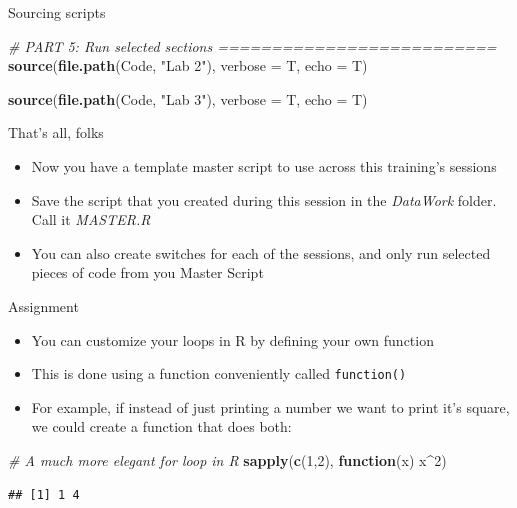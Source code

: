 \documentclass[ignorenonframetext,]{beamer}
\newenvironment{Shaded}{\begin{snugshade}}{\end{snugshade}}
\newcommand{\KeywordTok}[1]{\textcolor[rgb]{0.13,0.29,0.53}{\textbf{#1}}}
\newcommand{\DataTypeTok}[1]{\textcolor[rgb]{0.13,0.29,0.53}{#1}}
\newcommand{\DecValTok}[1]{\textcolor[rgb]{0.00,0.00,0.81}{#1}}
\newcommand{\StringTok}[1]{\textcolor[rgb]{0.31,0.60,0.02}{#1}}
\newcommand{\CommentTok}[1]{\textcolor[rgb]{0.56,0.35,0.01}{\textit{#1}}}
\newcommand{\ControlFlowTok}[1]{\textcolor[rgb]{0.13,0.29,0.53}{\textbf{#1}}}
\newcommand{\OperatorTok}[1]{\textcolor[rgb]{0.81,0.36,0.00}{\textbf{#1}}}
\newcommand{\NormalTok}[1]{#1}
\providecommand{\tightlist}{%
  \setlength{\itemsep}{0pt}\setlength{\parskip}{0pt}}
\begin{document}
\begin{frame}[fragile]{Sourcing scripts}

\begin{Shaded}
\begin{Highlighting}[]
\CommentTok{# PART 5: Run selected sections ==========================}
\KeywordTok{source}\NormalTok{(}\KeywordTok{file.path}\NormalTok{(Code, }\StringTok{"Lab 2"}\NormalTok{),}
       \DataTypeTok{verbose =}\NormalTok{ T,}
       \DataTypeTok{echo =}\NormalTok{ T)}

\KeywordTok{source}\NormalTok{(}\KeywordTok{file.path}\NormalTok{(Code, }\StringTok{"Lab 3"}\NormalTok{),}
       \DataTypeTok{verbose =}\NormalTok{ T,}
       \DataTypeTok{echo =}\NormalTok{ T)}
\end{Highlighting}
\end{Shaded}

\end{frame}

\begin{frame}{That's all, folks}

\begin{itemize}
\tightlist
\item
  Now you have a template master script to use across this training's
  sessions
\item
  Save the script that you created during this session in the
  \emph{DataWork} folder. Call it \emph{MASTER.R}
\item
  You can also create switches for each of the sessions, and only run
  selected pieces of code from you Master Script
\end{itemize}

\end{frame}

\begin{frame}[fragile]{Assignment}

\begin{itemize}
\tightlist
\item
  You can customize your loops in R by defining your own function
\item
  This is done using a function conveniently called \texttt{function()}
\item
  For example, if instead of just printing a number we want to print
  it's square, we could create a function that does both:
\end{itemize}

\begin{Shaded}
\begin{Highlighting}[]
    \CommentTok{# A much more elegant for loop in R}
    \KeywordTok{sapply}\NormalTok{(}\KeywordTok{c}\NormalTok{(}\DecValTok{1}\NormalTok{,}\DecValTok{2}\NormalTok{), }\ControlFlowTok{function}\NormalTok{(x) x}\OperatorTok{^}\DecValTok{2}\NormalTok{)}
\end{Highlighting}
\end{Shaded}

\begin{verbatim}
## [1] 1 4
\end{verbatim}

\end{frame}
\end{document}
